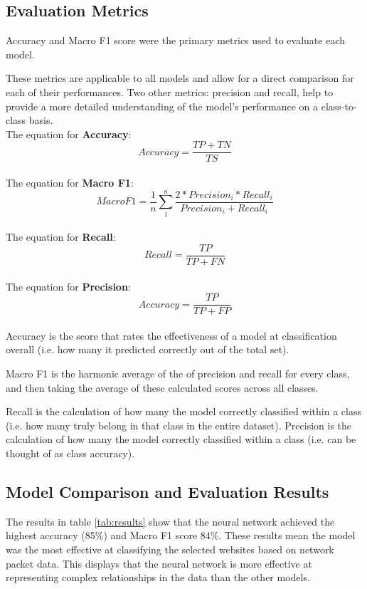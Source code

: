 \documentclass[10pt,sigconf,letterpaper,nonacm]{acmart}
\begin{document}
\subsection{Evaluation Metrics}
Accuracy and Macro F1 score were the primary metrics used to evaluate each model. 

These metrics are applicable to all models and allow for
a direct comparison for each of their performances. Two other metrics: precision and recall, help to provide a more detailed understanding of the model's performance on a class-to-class basis.
\newline \\
The equation for \textbf{Accuracy}: \\
\[
Accuracy= \frac{TP + TN}{TS}
\]
\newline \\
The equation for \textbf{Macro F1}: \\
\[
Macro F 1= \frac{1}{n} \sum_{1}^{n} \frac{2*Precision_i*Recall_i}{Precision_i+Recall_i}
\]
\newline \\
The equation for \textbf{Recall}: \\
\[
Recall= \frac{TP}{TP + FN}
\]
\newline \\
The equation for \textbf{Precision}: \\
\[
Accuracy= \frac{TP}{TP + FP}
\]
\\
Accuracy is the score that rates the effectiveness of a model at classification overall (i.e. how many it predicted correctly out of the total set). 

Macro F1 is the harmonic average of the of precision and recall for every class, and then taking the average of these calculated scores across all classes.

Recall is the calculation of how many the model correctly classified within a class (i.e. how many truly belong in that class in the entire dataset). 
Precision is the calculation of how many the model correctly classified within a class (i.e. can be thought of as class accuracy).


\subsection{Model Comparison and Evaluation Results}
The results in table \ref{tab:results} show that the neural network achieved the highest accuracy (85\%) and Macro F1 score 84\%. These results mean the model was the most effective at classifying the selected websites based on network packet data.
This displays that the neural network is more effective at representing complex relationships in the data than the other models. 
\end{document}
